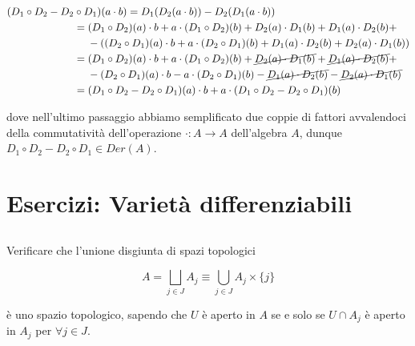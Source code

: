 \begin{align}
	\begin{split}
		(D_{1} \circ D_{2} - D_{2} &\circ D_{1})(a \cdot b) = D_{1}(D_{2}(a \cdot b)) - D_{2}(D_{1}(a \cdot b))\\
		&= (D_{1} \circ D_{2})(a) \cdot b + a \cdot (D_{1} \circ D_{2})(b) + D_{2}(a) \cdot D_{1}(b) + D_{1}(a) \cdot D_{2}(b) +\\
		& \hspace{13px} - ((D_{2} \circ D_{1})(a) \cdot b + a \cdot (D_{2} \circ D_{1})(b) + D_{1}(a) \cdot D_{2}(b) + D_{2}(a) \cdot D_{1}(b))\\
		&= (D_{1} \circ D_{2})(a) \cdot b + a \cdot (D_{1} \circ D_{2})(b) + \cancel{ D_{2}(a) \cdot D_{1}(b) } + \cancel{ D_{1}(a) \cdot D_{2}(b) } +\\
		& \hspace{13px} - (D_{2} \circ D_{1})(a) \cdot b - a \cdot (D_{2} \circ D_{1})(b) - \cancel{ D_{1}(a) \cdot D_{2}(b) } - \cancel{ D_{2}(a) \cdot D_{1}(b) }\\
		&= (D_{1} \circ D_{2} - D_{2} \circ D_{1})(a) \cdot b + a \cdot (D_{1} \circ D_{2} - D_{2} \circ D_{1})(b)
	\end{split}
\end{align}

dove nell'ultimo passaggio abbiamo semplificato due coppie di fattori avvalendoci della commutatività dell'operazione $ \cdot : A \to A $ dell'algebra $ A $, dunque $ D_{1} \circ D_{2} - D_{2} \circ D_{1} \in Der(A) $.

\chapter{Esercizi: Varietà differenziabili}

\section{}\label{BONUS2-1}

\begin{tcolorbox}
	Verificare che l'unione disgiunta di spazi topologici
	
	\begin{equation}
		A = \bigsqcup_{j \in J} A_{j} \equiv \bigcup_{j \in J} A_{j} \times \{j\}
	\end{equation}
	
	è uno spazio topologico, sapendo che $ U $ è aperto in $ A $ se e solo se $ U \cap A_{j} $ è aperto in $ A_{j} $ per $ \forall j \in J $.
\end{tcolorbox}

